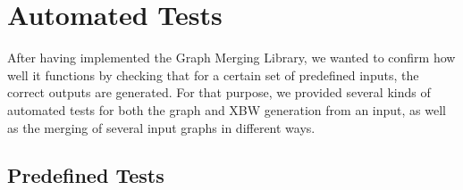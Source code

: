 \documentclass[a4paper,12pt,twoside,BCOR=10mm]{scrbook}
\begin{document}
\section{Automated Tests}
%

After having implemented the Graph Merging Library, 
we wanted to confirm how well it functions by checking 
that for a certain set of predefined inputs, the correct outputs are generated. 
For that purpose, we provided several kinds of automated tests for both the 
graph and XBW generation from an input, as well as the merging of several input graphs 
in different ways.

\subsection{Predefined Tests}
\end{document}
